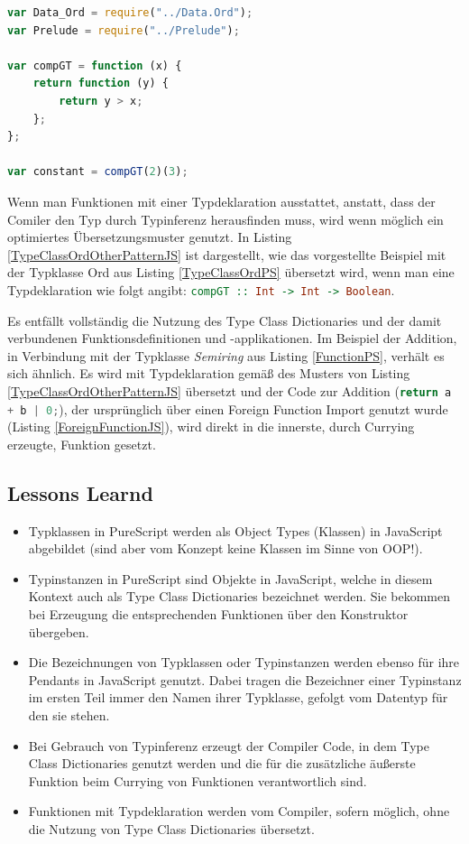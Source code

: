 \documentclass[
12pt,
ngerman,
oneside]
{scrbook} %
\begin{document}
\begin{lstlisting}[language=javascript, style=numbered-and-boxed, caption= Übersetzung nach JavaScript mit anderem Muster, label=TypeClassOrdOtherPatternJS]
var Data_Ord = require("../Data.Ord");
var Prelude = require("../Prelude");

var compGT = function (x) {
	return function (y) {
		return y > x;
	};
};

var constant = compGT(2)(3);
\end{lstlisting}

Wenn man Funktionen mit einer Typdeklaration ausstattet, anstatt, dass der Comiler den Typ durch Typinferenz herausfinden muss, wird wenn möglich ein optimiertes  Übersetzungsmuster genutzt. In Listing \ref{TypeClassOrdOtherPatternJS} ist dargestellt, wie das vorgestellte Beispiel mit der Typklasse Ord aus Listing \ref{TypeClassOrdPS} übersetzt wird, wenn man eine Typdeklaration wie folgt angibt: \glqq\lstinline[language=purescript, columns=fixed]{compGT :: Int -> Int -> Boolean}\grqq{}. 

Es entfällt vollständig die Nutzung des Type Class Dictionaries und der damit verbundenen Funktionsdefinitionen und -applikationen. Im Beispiel der Addition, in Verbindung mit der Typklasse \emph{Semiring} aus Listing \ref{FunctionPS}, verhält es sich ähnlich. Es wird mit Typdeklaration gemäß des Musters von Listing \ref{TypeClassOrdOtherPatternJS}  übersetzt und der Code zur Addition (\glqq\lstinline[language=javascript, columns=fixed]{return a + b | 0;}\grqq{}), der ursprünglich über einen Foreign Function Import genutzt wurde (Listing \ref{ForeignFunctionJS}), wird direkt in die innerste, durch Currying erzeugte, Funktion gesetzt.

\subsection{Lessons Learnd}
\begin{itemize}
	\item Typklassen in PureScript werden als Object Types (Klassen) in JavaScript abgebildet (sind aber vom Konzept keine Klassen im Sinne von OOP!).
	\item Typinstanzen in PureScript sind Objekte in JavaScript, welche in diesem Kontext auch als Type Class Dictionaries bezeichnet werden. Sie bekommen bei Erzeugung die entsprechenden Funktionen über den Konstruktor übergeben.
	\item Die Bezeichnungen von Typklassen oder Typinstanzen werden ebenso für ihre Pendants in JavaScript genutzt. Dabei tragen die Bezeichner einer Typinstanz im ersten Teil immer den Namen ihrer Typklasse, gefolgt vom Datentyp für den sie stehen.
	\item Bei Gebrauch von Typinferenz erzeugt der Compiler Code, in dem Type Class Dictionaries genutzt werden und die für die zusätzliche äußerste Funktion beim Currying von Funktionen verantwortlich sind.
	\item Funktionen mit Typdeklaration werden vom Compiler, sofern möglich, ohne die Nutzung von Type Class Dictionaries übersetzt.
\end{itemize}
\end{document}
